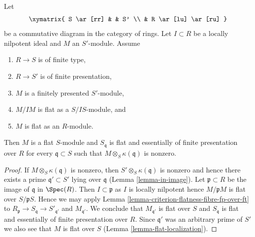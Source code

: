 \begin{lemma}
\label{lemma-criterion-flatness-fibre-locally-nilpotent}
Let
$$
\xymatrix{
S \ar[rr] & & S' \\
& R \ar[lu] \ar[ru]
}
$$
be a commutative diagram in the category of rings.
Let $I \subset R$ be a locally nilpotent ideal and
$M$ an $S'$-module. Assume
\begin{enumerate}
\item $R \to S$ is of finite type,
\item $R \to S'$ is of finite presentation,
\item $M$ is a finitely presented $S'$-module,
\item $M/IM$ is flat as a $S/IS$-module, and
\item $M$ is flat as an $R$-module.
\end{enumerate}
Then $M$ is a flat $S$-module and $S_\mathfrak q$ is flat
and essentially of finite presentation over $R$
for every $\mathfrak q \subset S$ such that
$M \otimes_S \kappa(\mathfrak q)$ is nonzero.
\end{lemma}

\begin{proof}
If $M \otimes_S \kappa(\mathfrak q)$ is nonzero, then
$S' \otimes_S \kappa(\mathfrak q)$ is nonzero and hence
there exists a prime $\mathfrak q' \subset S'$ lying over
$\mathfrak q$ (Lemma \ref{lemma-in-image}). Let
$\mathfrak p \subset R$ be the image of $\mathfrak q$ in $\Spec(R)$.
Then $I \subset \mathfrak p$ as $I$ is locally nilpotent
hence $M/\mathfrak p M$ is flat over $S/\mathfrak pS$.
Hence we may apply Lemma \ref{lemma-criterion-flatness-fibre-fp-over-ft}
to $R_\mathfrak p \to S_\mathfrak q \to S'_{\mathfrak q'}$
and $M_{\mathfrak q'}$. We conclude that $M_{\mathfrak q'}$
is flat over $S$ and $S_\mathfrak q$ is flat and essentially
of finite presentation over $R$.
Since $\mathfrak q'$ was an arbitrary prime of $S'$ we also
see that $M$ is flat over $S$ (Lemma \ref{lemma-flat-localization}).
\end{proof}















